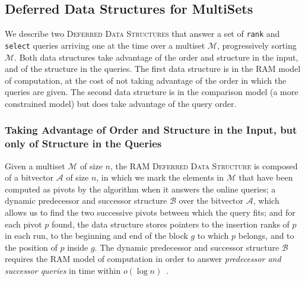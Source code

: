 \subsection{Deferred Data Structures for MultiSets}
\label{sec:dds}

We describe two \textsc{Deferred Data Structures} that answer a set of \texttt{rank} and \texttt{select} queries arriving one at the time over a multiset $\mathcal{M}$, progressively sorting $\mathcal{M}$.  
%
Both data structures take advantage of the order and structure in the input, and of the structure in the queries.
%
The first data structure is in the RAM model of computation, at the cost of not taking advantage of the order in which the queries are given. The second data structure is in the comparison model (a more constrained model) but does take advantage of the query order.

\subsubsection{Taking Advantage of  Order and Structure in the Input, but only of Structure in the Queries}

Given a multiset $\mathcal{M}$ of size $n$, the \textsc{RAM Deferred
  Data Structure} is composed of a bitvector $\mathcal{A}$ of size
$n$, in which we mark the elements in $\mathcal{M}$ that have been
computed as pivots by the algorithm when it answers the online
queries; a dynamic predecessor and successor structure $\mathcal{B}$
over the bitvector $\mathcal{A}$, which allows us to find the two
successive pivots between which the query fits; and for each pivot $p$
found, the data structure stores pointers to the insertion ranks of
$p$ in each run, to the beginning and end of the block $g$ to which
$p$ belongs, and to the position of $p$ inside $g$. The dynamic
predecessor and successor structure $\mathcal{B}$ requires the RAM
model of computation in order to answer \emph{predecessor and
  successor queries} in time within
$o(\log{n})$~\cite{2002-JCSS-OptimalBoundsForThePredecessorProblemAndRelatedProblems-BeameFich}.

